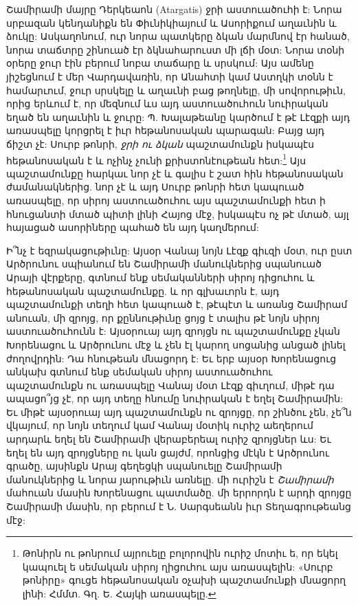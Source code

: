 \documentclass{article}
\begin{document}
{Շամիրամի մայրը Դերկեաոն (Atargatis) ջրի աստուածուհի է: Նորա սրբազան կենդանիքն են Փիւնիկիայում և Ասորիքում աղաւնին և ձուկը: Ասկաղոնում, ուր նորա պատկերը ձկան մարմնով էր հանած, նորա տաճտրը շինուած էր ձկնահարուստ մի լճի մօտ: Նորա տօնի օրերը ջուր էին բերում նոբա տաճարը և սրսկում: Այս ամենը յիշեցնում է մեր Վարդավառին, որ Անահտի կամ Աստղկի տօնն է համարւում, ջուր սրսկելը և աղաւնի բաց թողնելը, մի սովորութիւն, որից երևում է, որ մեզնում ևս այդ աստուածուհուն նուիրական եղած են աղաւնին և ջուրը: Պ. Խալաթեանը կարծում է թէ Լէզքի այդ առասպելը կորցրել է իւր հեթանոսական պարագան: Բայց այդ ճիշտ չէ: Սուրբ թոնրի, \emph{ջրի ու ձկան} պաշտամունքն իսկապէս հեթանոսական է և ոչինչ չունի քրիստոնէութեան հետ:\footnote{Թոնիրն ու թոնրում այրուելը բոլորովին ուրիշ մոտիւ ե, որ եկել կապուել ե սեմական սիրոյ ղիցուհու այս առասպելին: «Սուրբ թոնիրը» գուցե հեթանոսական օչախի պաշտամունքի մնացորղ լինի: Հմմտ. Գղ. Ե. Հայկի առասպելը.} Այս պաշտամունքը հարկաւ նոր չէ և գալիս է շատ հին հեթանոսական ժամանակներից. նոր չէ և այդ Սուրբ թոնրի հետ կապուած առասպելը, որ սիրոյ աստուածուհու այս պաշտամունքի հետ ի հնուցանտի մտած պիտի լինի Հայոց մէջ, իսկապէս ոչ թէ մտած, այլ հայացած ասորիները պահած են այդ կաղմերում:

Ի՞նչ է եզրակացութիւնը: Այսօր Վանայ նոյն Լէզք գիւզի մօտ, ուր ըստ Արծրունու սպիանում են Շամիրամի մանուկներից սպանուած Արայի վէրքերը, գտնում ենք սեմականների սիրոյ դիցուհու և հեթանոսական պաշտամունքը. և որ գլխաւորն է, այդ պաշտամունքի տեղի հետ կապուած է, թէպէտ և առանց Շամիրամ անուան, մի զրոյց, որ քըննութիւնը ցոյց է տալիս թէ նոյն սիրոյ աստուածուհունն է: Այսօրուայ այդ զրոյցն ու պաշտամունքը չկան Խորենացու և Արծրունու մէջ և չեն էլ կարող սոցանից անցած լինել ժողովրդին: Դա հնութեան մնացորդ է: Եւ երբ այսօր Խորենացուց անկախ գտնում ենք սեմական սիրոյ աստուածուհու պաշտամունքն ու առասպելը Վանայ մօտ Լէզք գիւղում, միթէ դա ապացո՞յց չէ, որ այդ տեղը հնումը նուիրական է եղել Շամիրամին: Եւ միթէ այսօրուայ այդ պաշտամունքն ու զրոյցը, որ շինծու չեն, չե՞ն վկայում, որ նոյն տեղում կամ Վանայ մօտիկ ուրիշ աեղերում արդարև եղել են Շամիրամի վերաբերեալ ուրիշ զրոյցներ ևս: Եւ եղել են այդ զրոյցները ու կան ցայժմ, որոնցից մէկն է Արծրունու գրածը, այսինքն Արայ գեղեցկի սպանուելը Շամիրամի մանուկներից և նորա յարութիւն առնելը. մի ուրիշն է \emph{Շամիրամի} մահուան մասին Խորենացու պատմածը. մի երրորդն է արդի զրոյցը Շամիրամի մասին, որ բերում է Ն. Սարգսեանն իւր Տեղագրութեանց մէջ:

}
\end{document}
